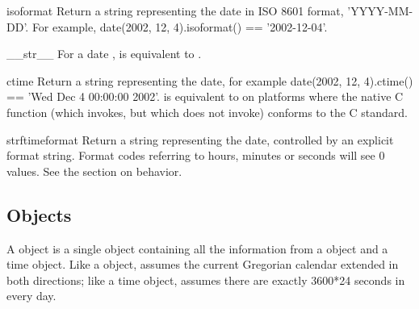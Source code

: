 \begin{methoddesc}{isoformat}{}
  Return a string representing the date in ISO 8601 format,
  'YYYY-MM-DD'.  For example,
  date(2002, 12, 4).isoformat() == '2002-12-04'.
\end{methoddesc}

\begin{methoddesc}{__str__}{}
  For a date ,  is equivalent to
  .
\end{methoddesc}

\begin{methoddesc}{ctime}{}
  Return a string representing the date, for example
  date(2002, 12, 4).ctime() == 'Wed Dec  4 00:00:00 2002'.
   is equivalent to
  on platforms where the native C  function
  (which  invokes, but which
   does not invoke) conforms to the C standard.
\end{methoddesc}

\begin{methoddesc}{strftime}{format}
  Return a string representing the date, controlled by an explicit
  format string.  Format codes referring to hours, minutes or seconds
  will see 0 values.
  See the section on  behavior.
\end{methoddesc}


\subsection{ Objects \label{datetime-datetime}}

A  object is a single object containing all the
information from a  object and a time object.  Like a
 object,  assumes the current Gregorian
calendar extended in both directions; like a time object,
 assumes there are exactly 3600*24 seconds in every
day.

